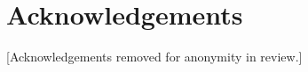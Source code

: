\documentclass[12pt,twoside]{article}
\begin{document}
\section*{Acknowledgements}



[Acknowledgements removed for anonymity in review.]

\label{sec:refs}
\printbibliography
\end{document}
